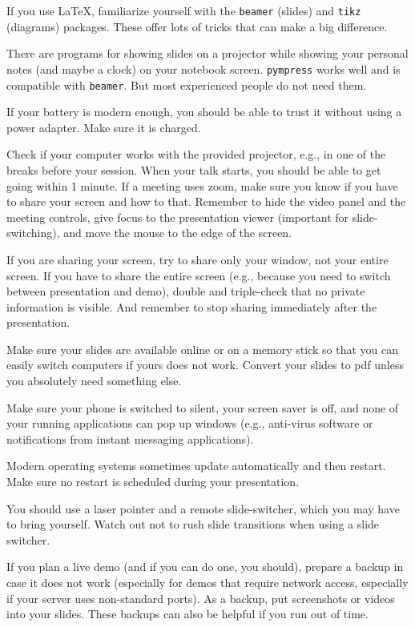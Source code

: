 \documentclass[12pt]{article}
\begin{document}
If you use LaTeX, familiarize yourself with the \texttt{beamer} (slides) and \texttt{tikz} (diagrams) packages.
These offer lots of tricks that can make a big difference.
\medskip

There are programs for showing slides on a projector while showing your personal notes (and maybe a clock) on your notebook screen.
\texttt{pympress} works well and is compatible with \texttt{beamer}. 
But most experienced people do not need them.
\medskip

If your battery is modern enough, you should be able to trust it without using a power adapter.
Make sure it is charged.
\medskip

Check if your computer works with the provided projector, e.g., in one of the breaks before your session.
When your talk starts, you should be able to get going within 1 minute.
If a meeting uses zoom, make sure you know if you have to share your screen and how to that.
Remember to hide the video panel and the meeting controls, give focus to the presentation viewer (important for slide-switching), and move the mouse to the edge of the screen.
\medskip

If you are sharing your screen, try to share only your window, not your entire screen.
If you have to share the entire screen (e.g., because you need to switch between presentation and demo), double and triple-check that no private information is visible.
And remember to stop sharing immediately after the presentation.
\medskip

Make sure your slides are available online or on a memory stick so that you can easily switch computers if yours does not work.
Convert your slides to pdf unless you absolutely need something else.
\medskip

Make sure your phone is switched to silent, your screen saver is off, and none of your running applications can pop up windows (e.g., anti-virus software or notifications from instant messaging applications).
\medskip

Modern operating systems sometimes update automatically and then restart.
Make sure no restart is scheduled during your presentation.
\medskip

You should use a laser pointer and a remote slide-switcher, which you may have to bring yourself.
Watch out not to rush slide transitions when using a slide switcher.
\medskip

If you plan a live demo (and if you can do one, you should), prepare a backup in case it does not work (especially for demos that require network access, especially if your server uses non-standard ports).
As a backup, put screenshots or videos into your slides.
These backups can also be helpful if you run out of time.
\medskip
\end{document}
